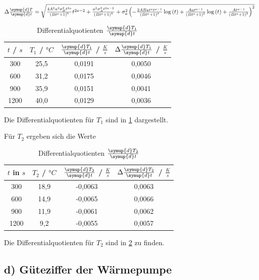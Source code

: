 $\Delta \frac{\symup{d}T}{\symup{d}t} = \sqrt{\frac{4 A^{2} a^{2} \sigma_{B}^{2} t^{2 a}}{\left(B t^{a} + 1\right)^{6}} t^{2 a - 2} + \frac{a^{2} \sigma_{A}^{2} t^{2 a - 2}}{\left(B t^{a} + 1\right)^{4}} + \sigma_{a}^{2} \left(- \frac{2 A B a t^{a} t^{a - 1}}{\left(B t^{a} + 1\right)^{3}} \log{\left (t \right )} + \frac{A a t^{a - 1}}{\left(B t^{a} + 1\right)^{2}} \log{\left (t \right )} + \frac{A t^{a - 1}}{\left(B t^{a} + 1\right)^{2}}\right)^{2}}$

\begin{table}
	\centering
	\caption{Differentialquotienten $\frac{\symup{d}T_1}{\symup{d}t}$ }
	\label{tab:diffT1}
\begin{tabular}{cccc}
	\toprule
	$t$ / $s$ & $T_1$ / $°C$ & $\frac{\symup{d}T_1}{\symup{d}t}$ / $\frac{K}{s}$ & $\Delta \frac{\symup{d}T_1}{\symup{d}t}$  / $\frac{K}{s}$ \\
	\midrule
	300 & 25,5 & 0,0191 & 0,0050 \\
	600 & 31,2 & 0,0175 & 0,0046 \\
	900 & 35,9 & 0,0151 & 0,0041 \\
	1200 & 40,0 & 0,0129 & 0,0036 \\
	\bottomrule
\end{tabular}
\end{table}

Die Differentialquotienten für  $T_1$ sind in \ref{tab:diffT1} dargestellt.

Für $T_2$ ergeben sich die Werte
\begin{table}
	\centering
	\caption{Differentialquotienten $\frac{\symup{d}T_2}{\symup{d}t}$}
	\label{tab:diffT2}
\begin{tabular}{cccc}
	\toprule
	$t$ in $s$ & $T_2$ / $°C$ & $\frac{\symup{d}T_2}{\symup{d}t}$ / $\frac{K}{s}$ & $\Delta \frac{\symup{d}T_2}{\symup{d}t}$  / $\frac{K}{s}$ \\
	\midrule
	300 & 18,9 & -0,0063 & 0,0063 \\
	600 & 14,9 & -0,0065 & 0,0066 \\
	900 & 11,9 & -0,0061 & 0,0062 \\
	1200 & 9,2 & -0,0055 & 0,0057 \\
	\bottomrule
\end{tabular}
\end{table}

Die Differentialquotienten für $T_2$ sind in \ref{tab:diffT2} zu finden.

\newpage


\subsection{d) Güteziffer der Wärmepumpe}

